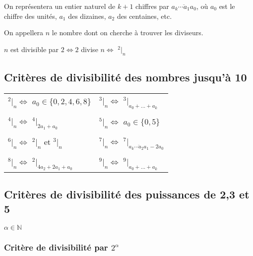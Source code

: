\documentclass[a4paper]{article}
\begin{document}
	\par On représentera un entier naturel de $k + 1$ chiffres par $\overline{a_k \cdots a_1 a_0}$, où $a_0$ est le chiffre des unités, $a_1$ des dizaines, $a_2$ des centaines, etc.\\

	\par On appellera $n$ le nombre dont on cherche à trouver les diviseurs.\\

	\par $n$ est divisible par $2 \Leftrightarrow 2$ divise $n \Leftrightarrow$ \Large $^2|_n$

	\bigskip \bigskip \bigskip

\subsection{Critères de divisibilité des nombres jusqu'à 10}

	\huge
	\bigskip

	\begin{tabular}{l|l}


		$^2|_n \Leftrightarrow$ $a_0 \in \{ 0,2,4,6,8 \}$ &
		$^3|_n \Leftrightarrow$ $^3|_{a_0 + \ldots + a_k}$ \\
	
	\tabularnewline

		$^4|_n \Leftrightarrow$ $^4|_{2a_1 + a_0}$ &
		$^5|_n \Leftrightarrow$ $a_0 \in \{ 0,5 \}$ \\
	
	\tabularnewline	
	
		$^6|_n \Leftrightarrow$ $^2|_n$ et $^3|_n$ &
		$^7|_n \Leftrightarrow$ $^7|_{\overline{a_k \cdots a_2 a_1} - 2 a_0}$ \\
	
	\tabularnewline	
	
		$^8|_n \Leftrightarrow$ $^2|_{4a_2 + 2a_1 + a_0}$ &
		$^9|_n \Leftrightarrow$ $^9|_{a_0 + \ldots + a_k}$ \\

	\end{tabular}

\pagebreak
\normalsize
\subsection{Critères de divisibilité des puissances de 2,3 et 5}

$\alpha \in \mathbb{N}$

\subsubsection*{Critère de divisibilité par $2^\alpha$}
\end{document}
